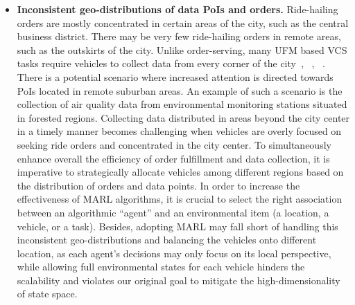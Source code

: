 \begin{itemize}
\smallskip
\item{{\bf Inconsistent geo-distributions of data PoIs and orders.} %
Ride-hailing orders are mostly concentrated in certain areas of the city, such as the central business district. There may be very few ride-hailing orders in remote areas, such as the outskirts of the city. Unlike order-serving, many UFM based VCS tasks require vehicles to collect data from every corner of the city~\cite{ding2021multi}, ~\cite{chen2016intelligent}, ~\cite{luo2019data}.
 There is a potential scenario where increased attention is directed towards PoIs located in remote suburban areas. An example of such a scenario is the collection of air quality data from environmental monitoring stations situated in forested regions. Collecting data distributed in areas beyond the city center in a timely manner becomes challenging when vehicles are overly focused on seeking ride orders and concentrated in the city center. To simultaneously enhance overall the efficiency of order fulfillment and data collection, it is imperative to strategically allocate vehicles among different regions based on the distribution of orders and data points. In order to increase the effectiveness of MARL algorithms, it is crucial to select the right association between an algorithmic ``agent'' and an environmental item (a location, a vehicle, or a task). Besides, adopting MARL may fall short of handling this inconsistent geo-distributions and balancing the vehicles onto different location, as each agent's decisions may only focus on its local perspective, while allowing full environmental states for each vehicle hinders the scalability and violates our original goal to mitigate the high-dimensionality of state space.}%


\end{itemize}
